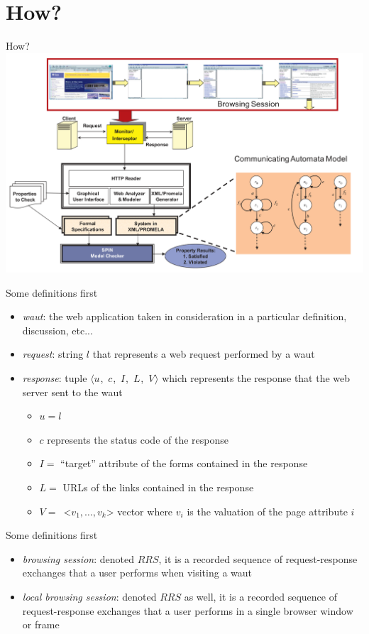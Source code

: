 \documentclass[usenames,dvipsnames]{beamer}
\newcommand{\res}[1][]{
  \ifthenelse{\equal{#1}{}}{\mbox{$\langle u$, $c$, $I$, $L$, $V\rangle$}}
  {\mbox{$\langle u_{#1}$, $c_{#1}$, $I_{#1}$, $L_{#1}$, $V_{#1}\rangle$}}
}
\theoremstyle{definition}
\begin{document}
\section{How?}
\begin{frame}{How?}
  \includegraphics[width=\textwidth]{../img/general_architecture.png}
\end{frame}

\begin{frame}{Some definitions first}
  \begin{itemize}
    \item \textit{\gls{waut}}: the web application taken in consideration in a particular definition, discussion, etc...
    \item \textit{request}: string $l$ that represents a web request performed by a \gls{waut}
    \item \textit{response}: tuple \res which represents the response that the web server sent to the \gls{waut}
      \begin{itemize}
        \item $u = l$
        \item $c$ represents the status code of the response \cite{Fielding2022}
        \item $I =$ ``target'' attribute of the forms contained in the response
        \item $L =$ URLs of the links contained in the response
        \item $V =$\ <$v_1,\dots,v_k$> vector where $v_i$ is the valuation of the page attribute $i$
      \end{itemize}
  \end{itemize}
\end{frame}

\begin{frame}{Some definitions first}
  \begin{itemize}
    \item \textit{browsing session}: denoted $RRS$, it is a recorded sequence of request-response exchanges that a user performs when visiting a \gls{waut}
    \item \textit{local browsing session}: denoted $RRS$ as well, it is a recorded sequence of request-response exchanges that a user performs in a single browser window or frame
  \end{itemize}
\end{frame}
\end{document}

